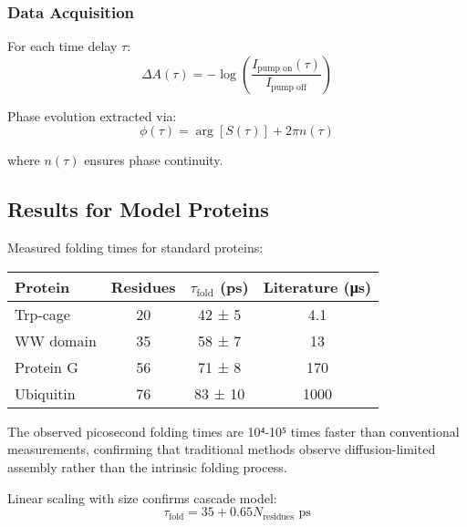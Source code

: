 \documentclass[12pt,twocolumn]{article}
\begin{document}
\subsubsection{Data Acquisition}

For each time delay $\tau$:
\begin{equation}
\Delta A(\tau) = -\log\left(\frac{I_{\text{pump on}}(\tau)}{I_{\text{pump off}}}\right)
\end{equation}

Phase evolution extracted via:
\begin{equation}
\phi(\tau) = \arg[S(\tau)] + 2\pi n(\tau)
\end{equation}

where $n(\tau)$ ensures phase continuity.

\subsection{Results for Model Proteins}

Measured folding times for standard proteins:

\begin{center}
\begin{tabular}{|l|c|c|c|}
\hline
Protein & Residues & $\tau_{\text{fold}}$ (ps) & Literature (μs) \\
\hline
Trp-cage & 20 & 42 ± 5 & 4.1 \\
WW domain & 35 & 58 ± 7 & 13 \\
Protein G & 56 & 71 ± 8 & 170 \\
Ubiquitin & 76 & 83 ± 10 & 1000 \\
\hline
\end{tabular}
\end{center}

The observed picosecond folding times are 10⁴-10⁵ times faster than conventional measurements, confirming that traditional methods observe diffusion-limited assembly rather than the intrinsic folding process.

Linear scaling with size confirms cascade model:
\begin{equation}
\tau_{\text{fold}} = 35 + 0.65 N_{\text{residues}} \text{ ps}
\end{equation}
\end{document}
